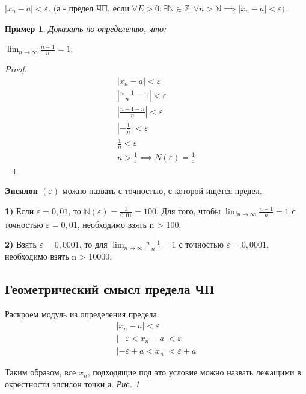 \documentclass[12pt, a4paper]{article}
\newtheorem{example}{Пример}[subsection]
\theoremstyle{remark}
\newcommand{\N}{\mathbb{N}}
\newcommand{\Z}{\mathbb{Z}}
\newcommand{\Y}{\mathbb{\forall}}
\newcommand{\F}{\mathbb{\exists}}
\newcommand{\E}{\mathbb{\varepsilon}}
\begin{document}
	$|x_n - a| < \E$. (а - предел ЧП, если $\Y E > 0:\F\N \in \Z: \Y n > \N \implies |x_n - a| < \E)$.
	
	\newpage
	\begin{example}
		Доказать по определению, что:
	\end{example}
	
	\begin{center}
		$\lim_{n \to \infty} \frac{n-1}{n} = 1$;
	\end{center}
	
	\begin{proof}
		\begin{gather*}
			|x_n - a| < \E \\
			\left|\frac{n-1}{n} - 1\right| < \E \\
			\left|\frac{n-1-n}{n}\right| < \E \\
			\left|-\frac{1}{n}\right| < \E \\
			\frac{1}{n} < \varepsilon \\
			n > \frac{1}{\varepsilon} \implies N(\E) = \frac{1}{\E}
		\end{gather*}
	\end{proof}
	
	\textbf{Эпсилон $(\E)$} можно назвать с точностью, с которой ищется предел.
	\vspace*{0.4cm}
	
	\textbf{1)} Если $\E = 0,01$, то $\N(\E) = \frac{1}{0,01} = 100$.
	Для того, чтобы $\lim_{n \to \infty} \frac{n-1}{n} = 1$ с точностью $\E = 0,01$, необходимо взять n > 100.
	
	\vspace*{0.4cm}
	\textbf{2)} Взять $\E = 0, 0001$, то для $\lim_{n \to \infty} \frac{n-1}{n} = 1$ с точностью $\E = 0,0001$, необходимо взять n > 10000.
	
	\vspace*{0.4cm}
	
	\subsection{Геометрический смысл предела ЧП}
	
	Раскроем модуль из определения предела:
	\begin{gather*}
		|x_n - a| < \E \\
		\left|-\E < x_n - a\right| < \E \\
		\left|-\E + a < x_n\right| < \E + a 
	\end{gather*}
	
	Таким образом, все $x_n$, подходящие под это условие можно назвать лежащими в окрестности эпсилон точки а. \textit{Рис. 1}
	
\end{document}
